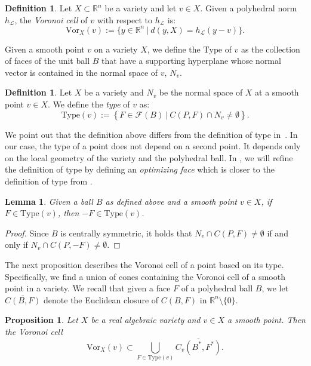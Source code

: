 \documentclass{article}
\numberwithin{theorem}{section}
\newtheorem{proposition}[theorem]{Proposition}
\newtheorem{lemma}[theorem]{Lemma}
\theoremstyle{definition}
\newtheorem{definition}[theorem]{Definition}
\theoremstyle{example_contd}
\newcommand{\vor}{\mathrm{Vor}}
\newcommand{\F}{\mathcal{F}}
\newcommand{\RR}{\mathbb{R}}
\newcommand{\type}{\mathrm{Type}}
\renewcommand{\L}{\mathcal{L}}
\begin{document}
	\begin{definition}
		Let $X\subset \RR^n$ be a variety and let $v\in X$. Given a polyhedral norm $h_\L$, the \emph{Voronoi cell} of $v$ with respect to $h_\L$ is:
		\[\vor_X(v):=\{y\in \RR^n~|~d(y,X)=h_\L(y-v)\}.\]
	\end{definition}


Given a smooth point $v$ on a variety $X$, we define the $\type$ of $v$ as the collection of faces of the unit ball $B$ that have a supporting hyperplane whose normal vector is contained in the normal space of $v$, $N_v.$


\begin{definition}\label{def:type}
	Let $X$ be a variety and $N_v$ 
	be the normal space of $X$ at a smooth point $v\in X.$ We define the \emph{type} of $v$ as:
	$$ \type(v):=\left\{F\in\F(B)~|~C(P,F)\cap N_v
	\neq \emptyset \right\}.$$
\end{definition}



We point out that the definition above differs from the definition of type in~\cite[Proposition 4]{CELIK_Wasserstein}. In our case, the type of a point does not depend on a second point. It depends only on the local geometry of the variety and the polyhedral ball. In , 
we will refine the definition of type by defining an \emph{optimizing face} which is closer to the definition of type from \cite{CELIK_Wasserstein}. 

\begin{lemma}
	Given a ball $B$ as defined above and a smooth point $v\in X$, if $F\in \type(v)$, then $-F\in \type(v)$. 
\end{lemma}
\begin{proof}
    Since $B$ is centrally symmetric, it holds that $N_v\cap C(P,F)\neq\emptyset$ if and only if $N_v\cap  C(P,-F)\neq \emptyset$. 
\end{proof}



The next proposition describes the Voronoi cell of a point based on its type. Specifically, we find a union of cones containing the Voronoi cell of a smooth point in a variety. We recall that given a face $F$ of a polyhedral ball $B$, we let $\overline{C(B,F)}$ denote the Euclidean closure of $C(B,F)$ in $\RR^n\setminus \{0\}.$





\begin{proposition}\label{prop:coneandtype}
	Let $X$ be a real algebraic variety and $v\in X$ a smooth point. Then the Voronoi cell 
    $$\vor_X(v) \subset \bigcup_{F\in\type(v)}\overline{C_v(B^*,F^*)}.$$
\end{proposition}
\end{document}
